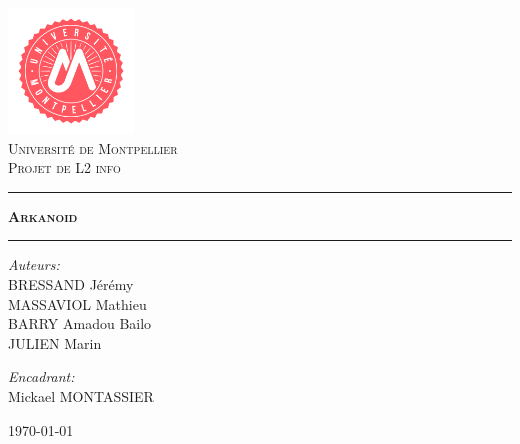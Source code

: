 
\begin{titlepage}
  \begin{center}
    \includegraphics[width=0.25\textwidth]{img/um.png}\\[2em]
    \textsc{\LARGE Université de Montpellier}\\[1em]
    \textsc{\Large Projet de L2 info}\\[5em]
    
    \rule[0.5ex]{\textwidth}{0.1mm}
    \textsc{\Huge \bfseries Arkanoid}\\
   \rule[0.5ex]{\textwidth}{0.1mm}
  \end{center}

  \noindent
  \begin{minipage}[t]{0.5\textwidth}
    \begin{flushleft} \large
    \emph{Auteurs:}\\
    \textsc{BRESSAND} Jérémy\\
    \textsc{MASSAVIOL} Mathieu\\
    \textsc{BARRY} Amadou Bailo\\
    \textsc{JULIEN} Marin\\
    \end{flushleft}
  \end{minipage}%
  \begin{minipage}[t]{0.5\textwidth}
    \begin{flushright} \large
      \emph{Encadrant:} \\
      Mickael \textsc{MONTASSIER}
      \end{flushright}
    \end{minipage}
  \vspace*{\fill}
  \begin{center}
    {\large \today}
  \end{center}
\end{titlepage}

